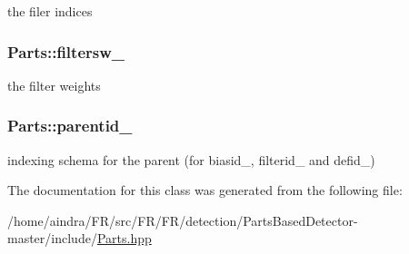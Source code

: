 the filer indices 

\hypertarget{classParts_a1de4d2cb595176d37aae609acbce88d8}{
\subsubsection[{filtersw\-\_\-}]{ {\bf \-Parts\-::filtersw\-\_\-}}}\label{classParts_a1de4d2cb595176d37aae609acbce88d8}


the filter weights 

\hypertarget{classParts_ad74222c286ee6ee93659109a6d1d625f}{
\subsubsection[{parentid\-\_\-}]{ {\bf \-Parts\-::parentid\-\_\-}}}\label{classParts_ad74222c286ee6ee93659109a6d1d625f}


indexing schema for the parent (for biasid\-\_\-, filterid\-\_\- and defid\-\_\-) 



\-The documentation for this class was generated from the following file\-:\begin{DoxyCompactItemize}
\item 
/home/aindra/\-F\-R/src/\-F\-R/\-F\-R/detection/\-Parts\-Based\-Detector-\/master/include/\hyperlink{Parts_8hpp}{\-Parts.\-hpp}\end{DoxyCompactItemize}
